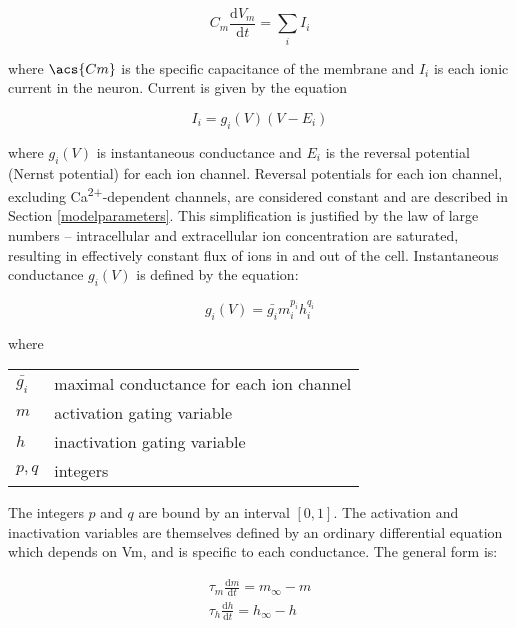 \begin{equation} \label{eq:voltage}
C_m \frac{\mathrm{d}V_m}{\mathrm{d}t} = \sum_{i} I_i
\end{equation}

where $\acs{Cm}$ is the specific capacitance of the membrane and $I_i$ is each ionic current in the neuron\cite{gorur-shandilya_xolotl_2018}. Current is given by the equation

\begin{equation} \label{eq: current}
    I_i = g_i(V)(V - E_i)
\end{equation}

where $g_i(V)$ is instantaneous conductance and $E_i$ is the reversal potential (Nernst potential) for each ion channel\cite{gorur-shandilya_xolotl_2018}. Reversal potentials for each ion channel, excluding Ca\textsuperscript{2+}-dependent channels, are considered constant and are described in Section \ref{modelparameters}. This simplification is justified by the law of large numbers -- intracellular and extracellular ion concentration are saturated, resulting in effectively constant flux of ions in and out of the cell\cite{liu_model_1998}. Instantaneous conductance $g_i(V)$ is defined by the equation:

\begin{equation} \label{eq: conductance}
    g_i(V) = \bar{g_i} m_i^{p_i} h_i^{q_i}
\end{equation}

where

\begin{tabular}{ll}
    $\bar{g_i}$     & maximal conductance for each ion channel \\
    $m$             & activation gating variable \\
    $h$             & inactivation gating variable \\
    $p, q$          & integers \\
\end{tabular}

The integers $p$ and $q$ are bound by an interval $[0,1]$\cite{gorur-shandilya_xolotl_2018}. The activation and inactivation variables are themselves defined by an ordinary differential equation which depends on \ac{Vm}, and is specific to each conductance. The general form is:

\begin{align}
    \tau_m \frac{\mathrm{d}m}{\mathrm{d}t} = m_\infty - m \\
    \tau_h \frac{\mathrm{d}h}{\mathrm{d}t} = h_\infty - h
\end{align}

